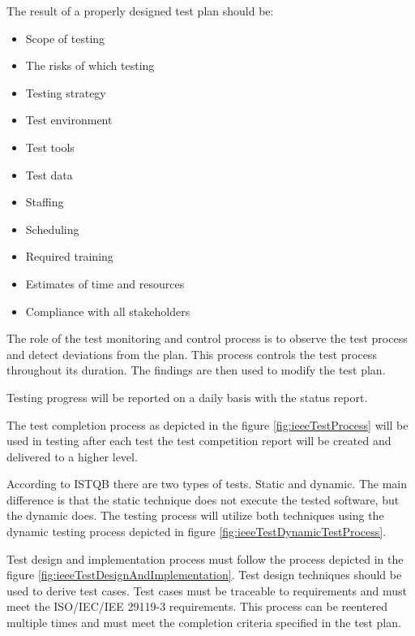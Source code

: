 The result of a properly designed test plan should be:
\begin{itemize}
    \item Scope of testing
    \item The risks of which testing
    \item Testing strategy
    \item Test environment
    \item Test tools
    \item Test data
    \item Staffing
    \item Scheduling
    \item Required training
    \item Estimates of time and resources
    \item Compliance with all stakeholders
\end{itemize}

The role of the test monitoring and control process is to observe the test process and detect deviations from the plan. This process controls the test process throughout its duration. The findings are then used to modify the test plan.

Testing progress will be reported on a daily basis with the status report.

The test completion process as depicted in the figure \ref{fig:ieeeTestProcess} will be used in testing after each test the test competition report will be created and delivered to a higher level.


According to ISTQB \cite{FoundationOfSoftwareTesting} there are two types of tests. Static and dynamic. The main difference is that the static technique does not execute the tested software, but the dynamic does. The testing process will utilize both techniques using the dynamic testing process depicted in figure \ref{fig:ieeeTestDynamicTestProcess}.


Test design and implementation process must follow the process depicted in the figure \ref{fig:ieeeTestDesignAndImplementation}. Test design techniques should be used to derive test cases. Test cases must be traceable to requirements and must meet the ISO/IEC/IEE 29119-3 requirements. This process can be reentered multiple times and must meet the completion criteria specified in the test plan.


